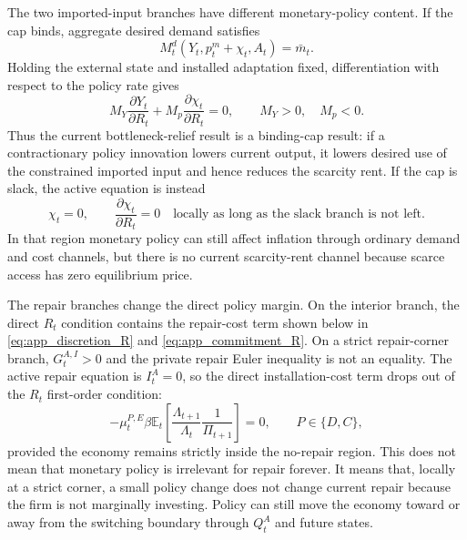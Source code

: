 ﻿\documentclass[12pt]{article}
\theoremstyle{remark}
\newcommand{\E}{\mathbb E}
\begin{document}
The two imported-input branches have different monetary-policy content. If the cap binds, aggregate
desired demand satisfies
\begin{equation}
    M_t^d(Y_t,p_t^m+\chi_t,A_t)=\bar m_t.
    \label{eq:app_binding_import_demand}
\end{equation}
Holding the external state and installed adaptation fixed, differentiation with respect to the
policy rate gives
\begin{equation}
    M_Y\frac{\partial Y_t}{\partial R_t}
    +
    M_p\frac{\partial \chi_t}{\partial R_t}
    =
    0,
    \qquad
    M_Y>0,\quad M_p<0.
    \label{eq:app_binding_chi_derivative}
\end{equation}
Thus the current bottleneck-relief result is a binding-cap result: if a contractionary policy
innovation lowers current output, it lowers desired use of the constrained imported input and hence
reduces the scarcity rent. If the cap is slack, the active equation is instead
\begin{equation}
    \chi_t=0,
    \qquad
    \frac{\partial\chi_t}{\partial R_t}=0
    \quad
    \text{locally as long as the slack branch is not left.}
    \label{eq:app_slack_chi_derivative}
\end{equation}
In that region monetary policy can still affect inflation through ordinary demand and cost channels,
but there is no current scarcity-rent channel because scarce access has zero equilibrium price.

The repair branches change the direct policy margin. On the interior branch, the direct $R_t$
condition contains the repair-cost term shown below in \eqref{eq:app_discretion_R} and
\eqref{eq:app_commitment_R}. On a strict repair-corner branch, $G_t^{A,I}>0$ and the private repair
Euler inequality is not an equality. The active repair equation is $I_t^A=0$, so the direct
installation-cost term drops out of the $R_t$ first-order condition:
\begin{equation}
    -\mu_t^{P,E}
    \beta
    \E_t
    \left[
        \frac{\Lambda_{t+1}}{\Lambda_t}
        \frac{1}{\Pi_{t+1}}
    \right]
    =
    0,
    \qquad
    P\in\{D,C\},
    \label{eq:app_corner_R_condition}
\end{equation}
provided the economy remains strictly inside the no-repair region. This does not mean that monetary
policy is irrelevant for repair forever. It means that, locally at a strict corner, a small policy
change does not change current repair because the firm is not marginally investing. Policy can still
move the economy toward or away from the switching boundary through $Q_t^A$ and future states.
\end{document}
